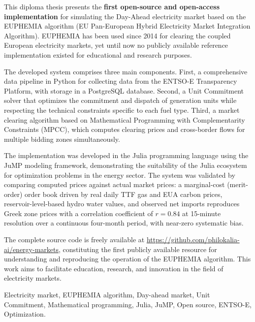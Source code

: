 \documentclass[diploma]{softlab-thesis}
\begin{document}

\begin{abstracten}%
This diploma thesis presents the \textbf{first open-source and open-access implementation} for simulating the Day-Ahead electricity market based on the EUPHEMIA algorithm (EU Pan-European Hybrid Electricity Market Integration Algorithm). EUPHEMIA has been used since 2014 for clearing the coupled European electricity markets, yet until now no publicly available reference implementation existed for educational and research purposes.

The developed system comprises three main components. First, a comprehensive data pipeline in Python for collecting data from the ENTSO-E Transparency Platform, with storage in a PostgreSQL database. Second, a Unit Commitment solver that optimizes the commitment and dispatch of generation units while respecting the technical constraints specific to each fuel type. Third, a market clearing algorithm based on Mathematical Programming with Complementarity Constraints (MPCC), which computes clearing prices and cross-border flows for multiple bidding zones simultaneously.

The implementation was developed in the Julia programming language using the JuMP modeling framework, demonstrating the suitability of the Julia ecosystem for optimization problems in the energy sector. The system was validated by comparing computed prices against actual market prices: a marginal-cost (merit-order) order book driven by real daily TTF gas and EUA carbon prices, reservoir-level-based hydro water values, and observed net imports reproduces Greek zone prices with a correlation coefficient of $r = 0.84$ at 15-minute resolution over a continuous four-month period, with near-zero systematic bias.

The complete source code is freely available at \url{https://github.com/philokalia-ai/energy-markets}, constituting the first publicly available resource for understanding and reproducing the operation of the EUPHEMIA algorithm. This work aims to facilitate education, research, and innovation in the field of electricity markets.
  \begin{keywordsen}
    Electricity market,
    EUPHEMIA algorithm,
    Day-ahead market,
    Unit Commitment,
    Mathematical programming,
    Julia,
    JuMP,
    Open source,
    ENTSO-E,
    Optimization.
  \end{keywordsen}
\end{abstracten}
\end{document}
